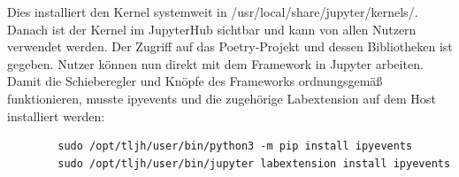  Dies installiert den Kernel systemweit in /usr/local/share/jupyter/kernels/.
 Danach ist der Kernel im JupyterHub sichtbar und kann von allen Nutzern verwendet werden. Der Zugriff auf
 das Poetry-Projekt und dessen Bibliotheken ist gegeben. Nutzer können nun direkt mit dem
 Framework in Jupyter arbeiten.
 Damit die Schieberegler und Knöpfe des Frameworks ordnungsgemäß funktionieren,
 musste ipyevents und die zugehörige Labextension auf dem Host installiert werden:

 \begin{center}
    \begin{verbatim}
        sudo /opt/tljh/user/bin/python3 -m pip install ipyevents
        sudo /opt/tljh/user/bin/jupyter labextension install ipyevents
    \end{verbatim}
\end{center}